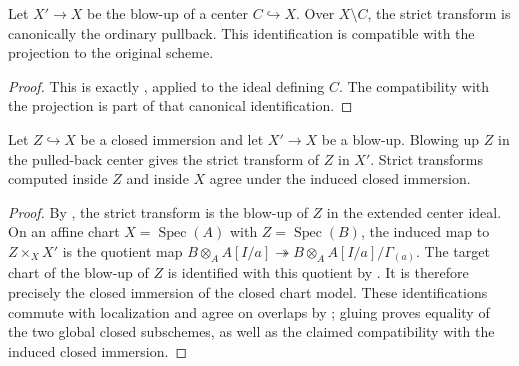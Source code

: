 \begin{lemma}
  \label{lemma:nagata-strict-transform-restrict}
  \leanok

  Let $X'\to X$ be the blow-up of a center $C\hookrightarrow X$.  Over
  $X\setminus C$, the strict transform is canonically the ordinary pullback.
  This identification is compatible with the projection to the original
  scheme.
\end{lemma}

\begin{proof}
  \leanok
  This is exactly
  , applied to the ideal
  defining $C$.  The compatibility with the projection is part of that
  canonical identification.
\end{proof}

\begin{lemma}
  \label{lemma:nagata-strict-transform-ambient-closed}
  \leanok

  Let $Z\hookrightarrow X$ be a closed immersion and let $X'\to X$ be a
  blow-up.  Blowing up $Z$ in the pulled-back center gives the strict transform
  of $Z$ in $X'$.  Strict transforms computed inside $Z$ and inside $X$ agree
  under the induced closed immersion.
\end{lemma}

\begin{proof}
  \leanok
  By , the strict transform is the
  blow-up of $Z$ in the extended center ideal.  On an affine chart
  $X=\operatorname{Spec}(A)$ with $Z=\operatorname{Spec}(B)$, the induced
  map to $Z\times_XX'$ is the quotient map
  $B\otimes_AA[I/a]\twoheadrightarrow
  B\otimes_AA[I/a]/\Gamma_{(a)}$.  The target chart of the blow-up of $Z$ is
  identified with this quotient by
  .  It is therefore precisely
  the closed immersion of the closed chart model.  These identifications
  commute with localization and agree on overlaps by
  ; gluing proves
  equality of the two global closed subschemes, as well as the claimed
  compatibility with the induced closed immersion.
\end{proof}

